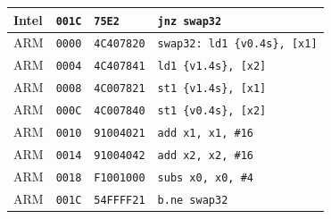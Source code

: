 \begin{table}[htbp]
\begin{tabular}{@{}l|l|l|p{7.2cm}@{}}
Intel & \texttt{001C} & \texttt{75E2} & \texttt{jnz swap32} \\
\midrule
ARM & \texttt{0000} & \texttt{4C407820} & \texttt{swap32: ld1 \{v0.4s\}, [x1]} \\
ARM & \texttt{0004} & \texttt{4C407841} & \texttt{ld1 \{v1.4s\}, [x2]} \\
ARM & \texttt{0008} & \texttt{4C007821} & \texttt{st1 \{v1.4s\}, [x1]} \\
ARM & \texttt{000C} & \texttt{4C007840} & \texttt{st1 \{v0.4s\}, [x2]} \\
ARM & \texttt{0010} & \texttt{91004021} & \texttt{add x1, x1, \#16} \\
ARM & \texttt{0014} & \texttt{91004042} & \texttt{add x2, x2, \#16} \\
ARM & \texttt{0018} & \texttt{F1001000} & \texttt{subs x0, x0, \#4} \\
ARM & \texttt{001C} & \texttt{54FFFF21} & \texttt{b.ne swap32} \\
\bottomrule
\end{tabular}
\endgroup
\end{table}
\noindent{}\par
